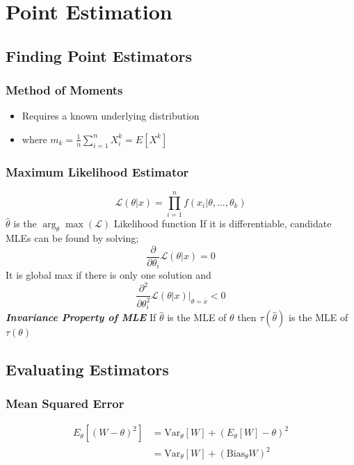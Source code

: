 \section{Point Estimation}
	\subsection{Finding Point Estimators}
		\subsubsection{Method of Moments}
			\begin{itemize}
				\item Requires a known underlying distribution
				\item where \(m_k = \frac{1}{n}\sum_{i=1}^{n}X_i^k = E[X^k]\)
			\end{itemize}
	
		\subsubsection{Maximum Likelihood Estimator}
		\[\mathcal{L}(\theta|x) = \prod_{i=1}^n f(x_i|\theta,\ldots,\theta_k)\]
		\(\hat{\theta}\) is the \(\arg_\theta\max(\mathcal{L})\) Likelihood  function
		If it is differentiable, candidate MLEs can be found by solving;
		\[\frac{\partial}{\partial\theta_i}\mathcal{L}(\theta|x)=0\]
		It is global max if there is only one solution and 
		\[\frac{\partial^2}{\partial\theta_i^2}\mathcal{L}(\theta|x)\bigg|_{\theta=\bar x}<0\]
		\textit{\textbf{Invariance Property of MLE}}
		If \(\hat{\theta}\) is the MLE of \(\theta\)
		then \(\tau(\hat\theta)\) is the MLE of \(\tau(\theta)\)
		
	\subsection{Evaluating Estimators}
		\subsubsection{Mean Squared Error}
			\begin{equation*}
				\begin{split}
					E_\theta[(W-\theta)^2] 
					&= \text{Var}_\theta[W] + (E_\theta[W]-\theta)^2 \\
					&= \text{Var}_\theta[W] + (\text{Bias}_\theta W)^2
				\end{split}
			\end{equation*}
		
